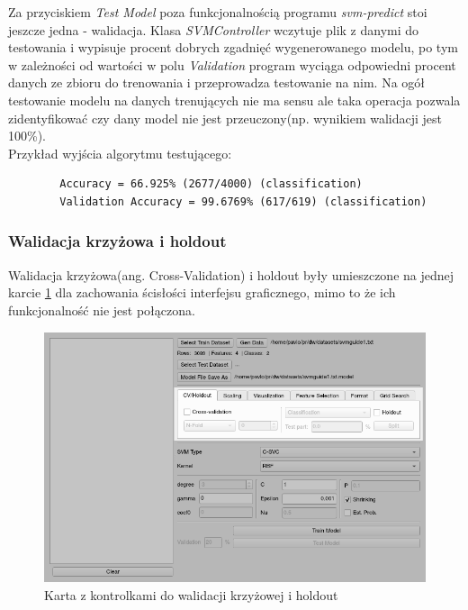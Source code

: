\documentclass[paper=a4, fontsize=11pt]{scrartcl} %
\numberwithin{equation}{section} %
\numberwithin{figure}{section} %
\begin{document}
    \par Za przyciskiem \textit{Test Model} poza funkcjonalnością programu \textit{svm-predict}
    stoi jeszcze jedna - walidacja. Klasa \textit{SVMController} wczytuje plik z danymi do
    testowania i wypisuje procent dobrych zgadnięć wygenerowanego modelu, po tym w zależności
    od wartości w polu \textit{Validation} program wyciąga odpowiedni procent danych ze zbioru
    do trenowania i przeprowadza testowanie na nim. Na ogół testowanie modelu na danych
    trenujących nie ma sensu ale taka operacja pozwala zidentyfikować czy dany model nie jest
    przeuczony(np. wynikiem walidacji jest 100\%). \\

    Przykład wyjścia algorytmu testującego:
    \begin{verbatim}
        Accuracy = 66.925% (2677/4000) (classification)
        Validation Accuracy = 99.6769% (617/619) (classification)
    \end{verbatim}

\newpage
\subsubsection{Walidacja krzyżowa i holdout}
    \par Walidacja krzyżowa(ang. Cross-Validation) i holdout były umieszczone na jednej karcie
    \ref{fig:cv_holdout} dla zachowania ścisłości interfejsu graficznego, mimo to że ich
    funkcjonalność nie jest połączona.

    \begin{figure}[H]
        \begin{center}
            \includegraphics[scale=0.7]{./img/svm_app_cv_holdout.png}
            \caption{Karta z kontrolkami do walidacji krzyżowej i holdout}
            \label{fig:cv_holdout}
        \end{center}
    \end{figure}
\end{document}
